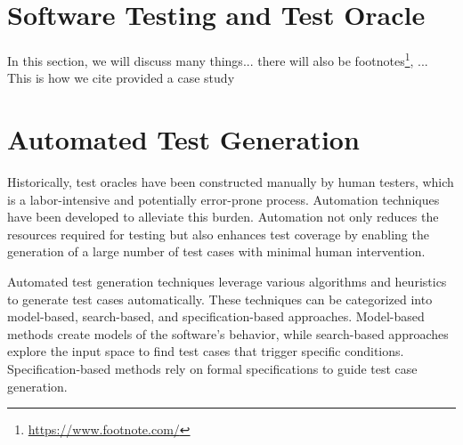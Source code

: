 \section{Software Testing and Test Oracle}
\label{sec:software_testing_and_oracle}
\vspace{0.2 cm}

In this section, we will discuss many things... there will also be footnotes\footnote{ \url{https://www.footnote.com/} }, ...
This is how we cite\cite{gabriel_ryan_toga_2022} provided a case study

\section{Automated Test Generation}
\label{sec:automated_test_generation}
\vspace{0.2 cm}

Historically, test oracles have been constructed manually by human testers, which is a labor-intensive and potentially error-prone process. Automation techniques have been developed to alleviate this burden. Automation not only reduces the resources required for testing but also enhances test coverage by enabling the generation of a large number of test cases with minimal human intervention.

Automated test generation techniques leverage various algorithms and heuristics to generate test cases automatically. These techniques can be categorized into model-based, search-based, and specification-based approaches. Model-based methods create models of the software's behavior, while search-based approaches explore the input space to find test cases that trigger specific conditions. Specification-based methods rely on formal specifications to guide test case generation.